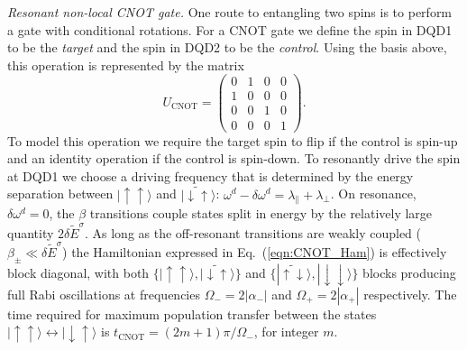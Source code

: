 \documentclass[%
 reprint,
 amsmath,amssymb,
 aps,
prl,
longbibliography
]{revtex4-1}
\begin{document}
 \textit{Resonant non-local {\rm CNOT} gate.} One route to entangling two spins is to perform a gate with conditional rotations. For a CNOT gate we define the spin in DQD1 to be the \textit{target} and the spin in DQD2 to be the \textit{control}. Using the basis above, this operation is represented by the matrix
 \begin{equation}\label{eq:CNOTmat}
     U_\text{CNOT} = 
     \begin{pmatrix}
      0 & 1 & 0 & 0\\
      1 & 0 & 0 & 0\\
      0 & 0 & 1 & 0\\
      0 & 0 & 0 & 1
     \end{pmatrix}.
 \end{equation}
 To model this operation we require the target spin to flip if the control is spin-up and an identity operation if the control is spin-down.
 To resonantly drive the spin at DQD1 we choose a driving frequency that is determined by the energy separation between $|\uparrow\uparrow\rangle$ and $|\widetilde{\downarrow\uparrow}\rangle$:
 $\omega^d-\delta\omega^d=\lambda_\parallel + \lambda_\perp$. On resonance, $\delta\omega^d=0$, the $\beta$ transitions couple states split in energy by the relatively large quantity $2 \delta \tilde{E}^{\sigma}$. As long as the off-resonant transitions are weakly coupled ($\beta_\pm \ll \delta\tilde{E}^\sigma$) the Hamiltonian expressed in  Eq.~(\ref{eqn:CNOT_Ham}) is effectively block diagonal, with both $\{|\uparrow\uparrow\rangle,|\widetilde{\downarrow\uparrow}\rangle\}$ and $\{|\widetilde{\uparrow\downarrow}\rangle,|\downarrow\downarrow\rangle\}$ blocks producing full Rabi oscillations at frequencies $\Omega_-=2|\alpha_-|$ and $\Omega_+=2|\alpha_+|$ respectively. The time required for maximum population transfer between the states $|\uparrow\uparrow\rangle\leftrightarrow|\downarrow\uparrow\rangle$ is $t_\text{CNOT}=(2m+1)\pi/\Omega_-$, for integer $m$.

 
 
\end{document}
